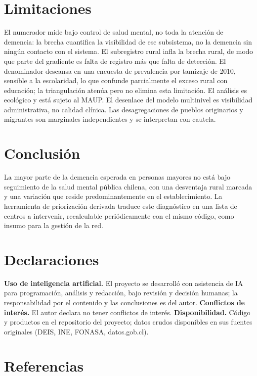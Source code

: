 \documentclass[
  spanish,
  letterpaper,
  DIV=11,
  numbers=noendperiod]{scrartcl}
\begin{document}
\section{Limitaciones}\label{limitaciones}

El numerador mide bajo control de salud mental, no toda la atención de
demencia: la brecha cuantifica la visibilidad de ese subsistema, no la
demencia sin ningún contacto con el sistema. El subregistro rural infla
la brecha rural, de modo que parte del gradiente es falta de registro
más que falta de detección. El denominador descansa en una encuesta de
prevalencia por tamizaje de 2010, sensible a la escolaridad, lo que
confunde parcialmente el exceso rural con educación; la triangulación
atenúa pero no elimina esta limitación. El análisis es ecológico y está
sujeto al MAUP. El desenlace del modelo multinivel es visibilidad
administrativa, no calidad clínica. Las desagregaciones de pueblos
originarios y migrantes son marginales independientes y se interpretan
con cautela.

\section{Conclusión}\label{conclusiuxf3n}

La mayor parte de la demencia esperada en personas mayores no está bajo
seguimiento de la salud mental pública chilena, con una desventaja rural
marcada y una variación que reside predominantemente en el
establecimiento. La herramienta de priorización derivada traduce este
diagnóstico en una lista de centros a intervenir, recalculable
periódicamente con el mismo código, como insumo para la gestión de la
red.

\section*{Declaraciones}\label{declaraciones}

\textbf{Uso de inteligencia artificial.} El proyecto se desarrolló con
asistencia de IA para programación, análisis y redacción, bajo revisión
y decisión humanas; la responsabilidad por el contenido y las
conclusiones es del autor. \textbf{Conflictos de interés.} El autor
declara no tener conflictos de interés. \textbf{Disponibilidad.} Código
y productos en el repositorio del proyecto; datos crudos disponibles en
sus fuentes originales (DEIS, INE, FONASA, datos.gob.cl).

\section*{Referencias}\label{referencias}
\end{document}
